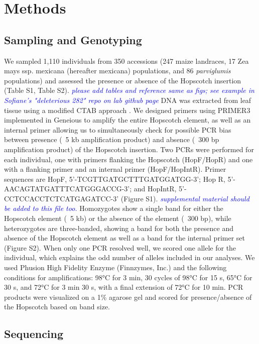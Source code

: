 \documentclass[12pt]{article}
\newcommand{\jri}[1]{\textcolor{blue}{ \emph{\scriptsize  #1}} }
\begin{document}
 
\section*{Methods}

\subsection*{Sampling and Genotyping}

We sampled 1,110 individuals from 350 accessions (247 maize landraces, 17 Zea mays ssp. mexicana (hereafter mexicana) populations, and 86 \emph{parviglumis} populations) and assessed the presence or absence of the Hopscotch insertion (Table S1, Table S2). \jri{please add tables and reference same as figs; see example in Sofiane's "deleterious 282" repo on lab github page} DNA was extracted from leaf tissue using a modified CTAB approach \cite{Doyle and Doyle 1990, Maloof et al 1984}. We designed primers using PRIMER3 \cite{Rozen and Skaletsky 2000} implemented in Geneious \cite{Kearse et al 2012} to amplify the entire Hopscotch element, as well as an internal primer allowing us to simultaneously check for possible PCR bias between presence (~5 kb amplification product) and absence (~300 bp amplification product) of the Hopscotch insertion. Two PCRs were performed for each individual, one with primers flanking the Hopscotch (HopF/HopR) and one with a flanking primer and an internal primer (HopF/HopIntR). Primer sequences are HopF, 5'-TCGTTGATGCTTTGATGGATGG-3'; 
Hop R, 5'-AACAGTATGATTTCATGGGACCG-3'; and HopIntR, 5'-CCTCCACCTCTCATGAGATCC-3' (Figure S1). \jri{supplemental material should be added to this file too.} Homozygotes show a single band for either the Hopscotch element (~5 kb) or the absence of the element (~300 bp), while heterozygotes are three-banded, showing a band for both the presence and absence of the Hopscotch element as well as a band for the internal primer set (Figure S2). When only one PCR resolved well, we scored one allele for the individual, which explains the odd number of alleles included in our analyses. We used Phusion High Fidelity Enzyme (Finnzymes, Inc.) and the following conditions for amplifications: 98°C for 3 min, 30 cycles of 98°C for 15 s, 65°C for 30 s, and 72°C for 3 min 30 s, with a final extension of 72°C for 10 min. PCR products were visualized on a 1\% agarose gel and scored for presence/absence of the Hopscotch based on band size.

\subsection*{Sequencing}
\end{document}
